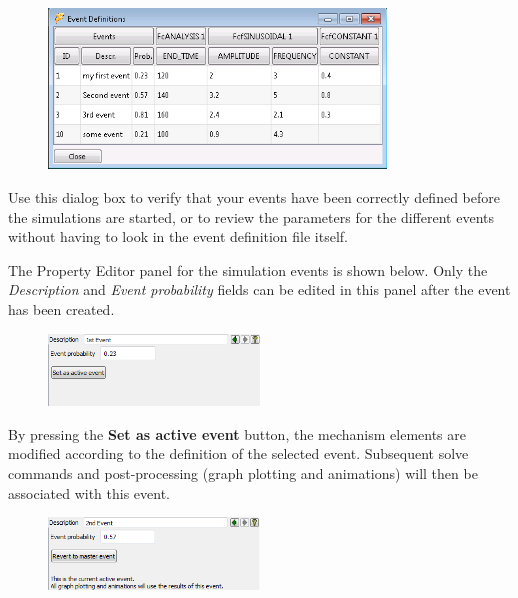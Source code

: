 {\begin{figure}[!h]
  \center
  \includegraphics[width=0.8\textwidth]{Figures/Dialogs/6-EventDef}
\end{figure}

Use this dialog box to verify that your events have been correctly defined
before the simulations are started, or to review the parameters for the
different events without having to look in the event definition file itself.



The Property Editor panel for the simulation events is shown below.
Only the {\sl Description} and {\sl Event probability} fields can be edited
in this panel after the event has been created.

\begin{figure}
  \includegraphics[width=0.5\textwidth]{Figures/6-SimulationEventProperty1}
\end{figure}

By pressing the \textbf{Set as active event} button, the mechanism elements
are modified according to the definition of the selected event.
Subsequent solve commands and post-processing (graph plotting and
animations) will then be associated with this event.

\begin{figure}
  \vspace{-4mm}
  \includegraphics[width=0.5\textwidth]{Figures/6-SimulationEventProperty2}
\end{figure}

}
